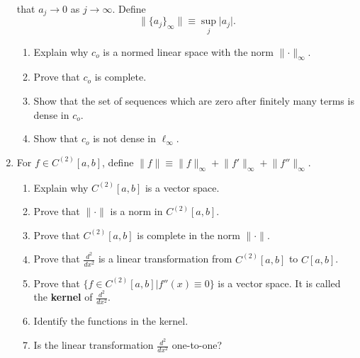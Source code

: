 \documentclass{article}
\begin{document}
\begin{enumerate}
            that $a_j\to 0$ as $j\to \infty$. Define
            \[
                  \lVert\{a_j\}_\infty\rVert\equiv\sup_j\lvert a_j\rvert.
            \]
            \begin{enumerate}
                  \item Explain why $c_o$ is a normed linear space with the norm
                        $\lVert\cdot\rVert_\infty$.
                  \item Prove that $c_o$ is complete.
                  \item Show that the set of sequences which are zero after
                        finitely many terms is dense in $c_o$.
                  \item Show that $c_o$ is not dense in $\ell_\infty$.
            \end{enumerate}
            \setcounter{enumi}{13}
      \item For $f\in C^{(2)}[a,b]$, define $\lVert f\rVert
                  \equiv\lVert f\rVert_\infty + \lVert f'\rVert_\infty
                  + \lVert f''\rVert_\infty$.
            \begin{enumerate}
                  \item Explain why $C^{(2)}[a,b]$ is a vector space.
                  \item Prove that $\lVert\cdot\rVert$ is a norm in
                        $C^{(2)}[a,b]$.
                  \item Prove that $C^{(2)}[a,b]$ is complete in the norm
                        $\lVert\cdot\rVert$.
                  \item Prove that $\frac{d^2}{dx^2}$ is a linear
                        transformation from $C^{(2)}[a,b]$ to $C[a,b]$.
                  \item Prove that $\{f\in C^{(2)}[a,b]|f''(x)\equiv 0\}$
                        is a vector space. It is called the \textbf{kernel} of
                        $\frac{d^2}{dx^2}$.
                  \item Identify the functions in the kernel.
                  \item Is the linear transformation $\frac{d^2}{dx^2}$
                        one-to-one?
            \end{enumerate}
\end{enumerate}
\end{document}

